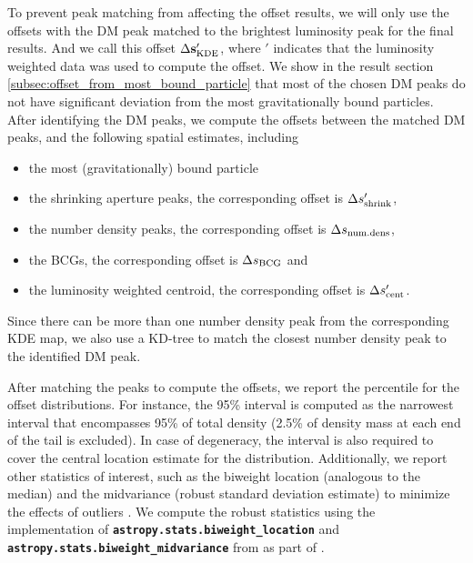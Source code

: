 To prevent peak matching from affecting the offset results,
we will only use the offsets with the DM peak matched to the brightest
luminosity peak for the final results.
And we call this offset $\Delta {\bf s}_{\rm KDE}'$, where $'$ indicates that the
luminosity weighted data was used to compute the offset. 
We show in the result section \ref{subsec:offset_from_most_bound_particle} 
that most of the chosen DM peaks
do not have significant deviation from the most gravitationally bound particles.
After identifying the DM peaks, we compute the 
offsets between the matched DM peaks, and the following spatial estimates, including 
\begin{itemize}
	\item the most (gravitationally) bound particle 
	\item the shrinking aperture peaks, the corresponding offset is $\Delta s_{\rm
		shrink}'$, 
	\item the number density peaks, the corresponding offset is $\Delta s_{\rm
		num.dens}$, 
	\item the BCGs, the corresponding offset is $\Delta s_{\rm BCG}$ and
\item the luminosity weighted centroid, the corresponding offset is $\Delta
	s_{\rm cent}'$.
\end{itemize}
Since there can be more than one number density peak from the corresponding KDE
map, we also use a KD-tree to match the closest number density peak to the 
identified DM peak.

After matching the peaks to compute the offsets, 
we report the percentile for the offset distributions.
For instance, the 95\% interval is computed as the narrowest interval that encompasses
95\% of total density (2.5\% of density mass at each end of the tail is
excluded). In case of degeneracy, the interval is also required to cover the 
central location estimate for the distribution.
Additionally, we report other statistics of interest, such as the biweight 
location (analogous to the median)
and the midvariance (robust standard deviation
estimate) to minimize the effects of outliers \citep{Beers90}. 
We compute the robust statistics using the 
implementation of {\bf \texttt{astropy.stats.biweight\_location}}
and {\bf \texttt{astropy.stats.biweight\_midvariance}}
from \cite{astropy} as part of {}. 

